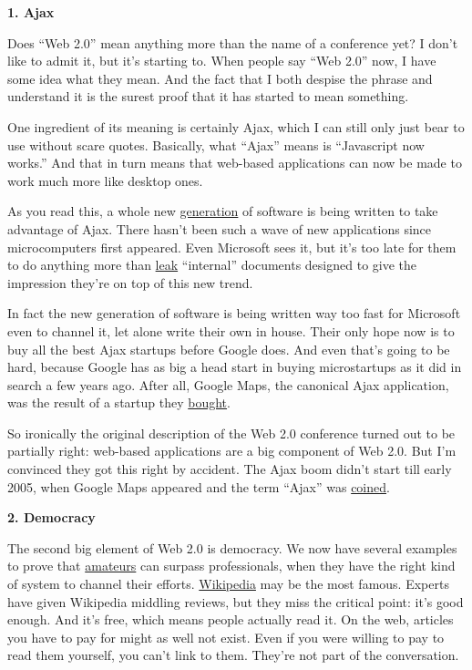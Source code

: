 \textbf{1. Ajax}

Does ``Web 2.0'' mean anything more than the name of a conference yet? I
don't like to admit it, but it's starting to. When people say ``Web
2.0'' now, I have some idea what they mean. And the fact that I both
despise the phrase and understand it is the surest proof that it has
started to mean something.

One ingredient of its meaning is certainly Ajax, which I can still only
just bear to use without scare quotes. Basically, what ``Ajax'' means is
``Javascript now works.'' And that in turn means that web-based
applications can now be made to work much more like desktop ones.

As you read this, a whole new
\href{http://online.wsj.com/public/article/SB113098635587487074.html?mod=todays_\%20free_feature}{generation}
of software is being written to take advantage of Ajax. There hasn't
been such a wave of new applications since microcomputers first
appeared. Even Microsoft sees it, but it's too late for them to do
anything more than \href{http://www.hypercamp.org/2005/11/09}{leak}
``internal'' documents designed to give the impression they're on top of
this new trend.

In fact the new generation of software is being written way too fast for
Microsoft even to channel it, let alone write their own in house. Their
only hope now is to buy all the best Ajax startups before Google does.
And even that's going to be hard, because Google has as big a head start
in buying microstartups as it did in search a few years ago. After all,
Google Maps, the canonical Ajax application, was the result of a startup
they
\href{http://googlemapsmania.blogspot.com/2005/10/google-maps-lead-engineer-gaze\%20s-into.html}{bought}.

So ironically the original description of the Web 2.0 conference turned
out to be partially right: web-based applications are a big component of
Web 2.0. But I'm convinced they got this right by accident. The Ajax
boom didn't start till early 2005, when Google Maps appeared and the
term ``Ajax'' was
\href{http://www.adaptivepath.com/publications/essays/archives/000385.php}{coined}.

\textbf{2. Democracy}

The second big element of Web 2.0 is democracy. We now have several
examples to prove that \href{opensource.html}{amateurs} can surpass
professionals, when they have the right kind of system to channel their
efforts. \href{http://wikipedia.org}{Wikipedia} may be the most famous.
Experts have given Wikipedia middling reviews, but they miss the
critical point: it's good enough. And it's free, which means people
actually read it. On the web, articles you have to pay for might as well
not exist. Even if you were willing to pay to read them yourself, you
can't link to them. They're not part of the conversation.

